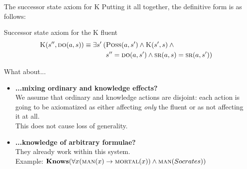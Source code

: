 \begin{frame}{The successor state axiom for K}
    Putting it all together, the definitive form is as follows:

    \begin{block}{Successor state axiom for the K fluent}
        \vspace{-0.5cm}
        \begin{align*}
            \textsc{K}(s'', \textsc{do}(a, s)) \equiv \exists s' \: (&\textsc{Poss}(a, s') \land \textsc{K}(s',s) \: \land \\
            & s'' = \textsc{do}(a, s') \land \textsc{sr}(a, s) = \textsc{sr}(a, s'))
        \end{align*}
    \end{block}
\end{frame}

\begin{frame}{What about...}
    \begin{itemize}
        \item \textbf{...mixing ordinary and knowledge effects?} \\
            We assume that ordinary and knowledge actions are disjoint:
            each action is going to be axiomatized
            as either affecting \emph{only} the \sck{} fluent
            or as not affecting it at all. \\
            This does not cause loss of generality.
        \item \textbf{...knowledge of arbitrary formulae?} \\
            They already work within this system. \\
            Example: \( \textbf{Knows}(\forall x (\textsc{man}(x) \rightarrow \textsc{mortal}(x)) \land \textsc{man}(Socrates)) \)
    \end{itemize}
\end{frame}


